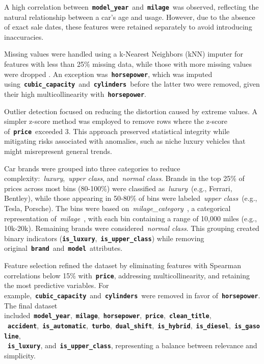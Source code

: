\documentclass[a4paper,oneside,bibliography=totoc]{scrbook}
\begin{document}
A high correlation between~\textbf{\texttt{model\_year}}~and~\textbf{\texttt{milage}}~was observed, reflecting the natural relationship between a car's age and usage. However, due to the absence of exact sale dates, these features were retained separately to avoid introducing inaccuracies.

Missing values were handled using a k-Nearest Neighbors (kNN) imputer for features with less than 25\% missing data, while those with more missing values were dropped \cite{jadhav2019}. An exception was~\textbf{\texttt{horsepower}}, which was imputed using~\textbf{\texttt{cubic\_capacity}}~and~\textbf{\texttt{cylinders}}~before the latter two were removed, given their high multicollinearity with~\textbf{\texttt{horsepower}}.

Outlier detection focused on reducing the distortion caused by extreme values. A simpler z-score method was employed to remove rows where the z-score of~\textbf{\texttt{price}}~exceeded 3. This approach preserved statistical integrity while mitigating risks associated with anomalies, such as niche luxury vehicles that might misrepresent general trends.

Car brands were grouped into three categories to reduce complexity:~\emph{luxury},~\emph{upper class}, and~\emph{normal class}. Brands in the top 25\% of prices across most bins (80-100\%) were classified as~\emph{luxury}~(e.g., Ferrari, Bentley), while those appearing in 50-80\% of bins were labeled~\emph{upper class}~(e.g., Tesla, Porsche). The bins were based on~\emph{milage\_category}~, a categorical representation of~\emph{milage}~, with each bin containing a range of 10,000 miles (e.g., 10k-20k). Remaining brands were considered~\emph{normal class}. This grouping created binary indicators (\textbf{\texttt{is\_luxury}},~\textbf{\texttt{is\_upper\_class}}) while removing original~\textbf{\texttt{brand}}~and~\textbf{\texttt{model}}~attributes.

Feature selection refined the dataset by eliminating features with Spearman correlations below 15\% with~\textbf{\texttt{price}}, addressing multicollinearity, and retaining the most predictive variables. For example,~\textbf{\texttt{cubic\_capacity}}~and~\textbf{\texttt{cylinders}}~were removed in favor of~\textbf{\texttt{horsepower}}. The final dataset included~\textbf{\texttt{model\_year}},~\textbf{\texttt{milage}},~\textbf{\texttt{horsepower}},~\textbf{\texttt{price}},~\textbf{\texttt{clean\_title}},\\~\textbf{\texttt{accident}},~\textbf{\texttt{is\_automatic}},~\textbf{\texttt{turbo}},~\textbf{\texttt{dual\_shift}},~\textbf{\texttt{is\_hybrid}},~\textbf{\texttt{is\_diesel}},~\textbf{\texttt{is\_gasoline}},\\~\textbf{\texttt{is\_luxury}}, and~\textbf{\texttt{is\_upper\_class}}, representing a balance between relevance and simplicity.
\end{document}

